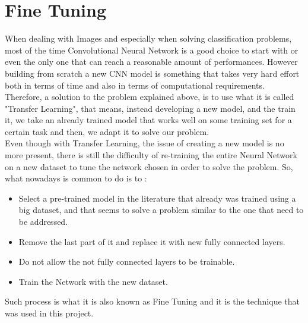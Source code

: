 
\section{Fine Tuning} 
\begin{flushleft}

When dealing with Images and especially when solving classification problems, most of the time Convolutional Neural Network is a good choice to start with or even the only one that can reach a reasonable amount of performances. However building from scratch a new CNN model is something that takes very hard effort both in terms of time and also in terms of computational requirements. \\
Therefore, a solution to the problem explained above, is to use what it is called "Transfer Learning", that means, instead developing a new model, and the train it, we take an already trained model that works well on some training set for a certain task and then, we adapt it to solve our problem. \\
Even though with Transfer Learning, the issue of creating a new model is no more present, there is still the difficulty of re-training the entire Neural Network on a new dataset to tune the network chosen in order to solve the problem. So, what nowadays is common to do is to :
\begin{itemize}
    \item Select a pre-trained model in the literature that already was trained using a big dataset, and that seems to solve a problem similar to the one that need to be addressed.
    \item Remove the last part of it and replace it with new fully connected layers.
    \item Do not allow the not fully connected layers to be trainable.
    \item Train the Network with the new dataset.
\end{itemize}

Such process is what it is also known as Fine Tuning and it is the technique that was used in this project. 
\end{flushleft}